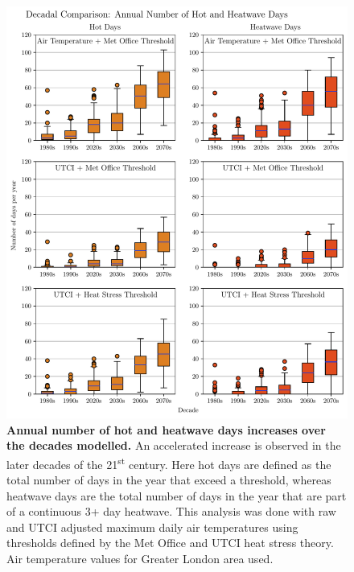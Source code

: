 \documentclass[10pt,letterpaper]{article}
\begin{document}
\begin{figure}
\begin{adjustwidth}{-2.25in}{0in}
    \begin{center}
        \includegraphics[width=0.9\linewidth]{./boxplots.pdf}
    \end{center}
    \caption{
    {\bf Annual number of hot and heatwave days increases over the decades modelled.}
    An accelerated increase is observed in the later decades of the 21\textsuperscript{st} century.
    Here hot days are defined as the total number of days in the year that exceed a threshold, whereas heatwave days are the total number of days in the year that are part of a continuous 3+ day heatwave. This analysis was done with raw and UTCI adjusted maximum daily air temperatures using thresholds defined by the Met Office and UTCI heat stress theory. Air temperature values for Greater London area used.
    }
    \label{boxplots}
\end{adjustwidth}
\end{figure}
\end{document}
